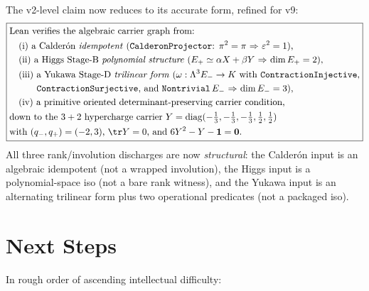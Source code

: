 The v2-level claim now reduces to its accurate form, refined
for v9:
\[
\boxed{
\begin{aligned}
&\text{Lean verifies the algebraic carrier graph from:}\\
&\quad\text{(i) a Calder\'on \emph{idempotent}
     ($\texttt{CalderonProjector}$: $\pi^2 = \pi$ $\Rightarrow$
     $\varepsilon^2 = 1$),}\\
&\quad\text{(ii) a Higgs Stage-B \emph{polynomial structure}
     ($E_+ \simeq \alpha X + \beta Y$ $\Rightarrow$
     $\dim E_+ = 2$),}\\
&\quad\text{(iii) a Yukawa Stage-D \emph{trilinear form}
     ($\omega : \Lambda^3 E_- \to K$ with
     \texttt{ContractionInjective},}\\
&\quad\text{\phantom{(iii) }\texttt{ContractionSurjective}, and
     \texttt{Nontrivial}\,$E_-$ $\Rightarrow$ $\dim E_- = 3$),}\\
&\quad\text{(iv) a primitive oriented
     determinant-preserving carrier condition,}\\
&\text{down to the $3+2$ hypercharge carrier
     $Y = \mathrm{diag}(-\tfrac13,-\tfrac13,-\tfrac13,\tfrac12,\tfrac12)$}\\
&\text{with $(q_-, q_+) = (-2, 3)$, $\tr Y = 0$,
     and $6 Y^2 - Y - \mathbf 1 = \mathbf 0$.}
\end{aligned}
}
\]
All three rank/involution discharges are now \emph{structural}:
the Calder\'on input is an algebraic idempotent (not a wrapped
involution), the Higgs input is a polynomial-space iso (not a
bare rank witness), and the Yukawa input is an alternating
trilinear form plus two operational predicates (not a packaged
iso).

\section{Next Steps}
\label{sec:next}

In rough order of ascending intellectual difficulty:

